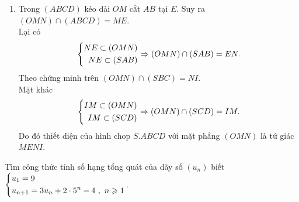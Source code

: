 \begin{bt}
{\begin{enumerate}
		\item Trong $ (ABCD) $ kéo dài $ OM $ cắt $ AB $ tại $ E $. Suy ra $ (OMN) \cap (ABCD) = ME $.\\
		Lại có 
		\begin{align*}
		\left\{\begin{aligned}NE \subset (OMN)\\NE \subset (SAB)\end{aligned}\right. \Rightarrow (OMN) \cap (SAB) = EN.
		\end{align*}
		Theo chứng minh trên $ (OMN) \cap (SBC) = NI $.\\
		Mặt khác
		\begin{align*}
		\left\{\begin{aligned}IM \subset (OMN)\\IM \subset (SCD)\end{aligned}\right. \Rightarrow (OMN) \cap (SCD) = IM.
		\end{align*}
		Do đó thiết diện của hình chop $ S.ABCD $ với mặt phẳng $ (OMN) $ là tứ giác $ MENI $.
	\end{enumerate}
	}
\end{bt}

\begin{bt}%
	Tìm công thức tính số hạng tổng quát của dãy số $ (u_n) $ biết $ \left\{\begin{aligned}& u_1 = 9\\& u_{n + 1} = 3u_n + 2\cdot 5^n - 4 \ , \ n \geqslant 1\end{aligned}\right. $.
\end{bt}

